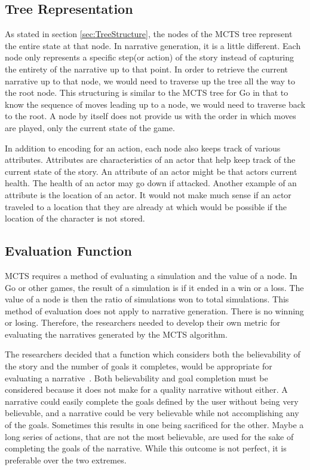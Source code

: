 \documentclass{sig-alternate}
\begin{document}
\subsection{Tree Representation}
As stated in section \ref{sec:TreeStructure}, the nodes of the MCTS tree represent the entire state at that node. In narrative generation, it is a little different. Each node only represents a specific step(or action) of the story instead of capturing the entirety of the narrative up to that point. In order to retrieve the current narrative up to that node, we would need to traverse up the tree all the way to the root node. This structuring is similar to the MCTS tree for Go in that to know the sequence of moves leading up to a node, we would need to traverse back to the root. A node by itself does not provide us with the order in which moves are played, only the current state of the game.

In addition to encoding for an action, each node also keeps track of various attributes. Attributes are characteristics of an actor that help keep track of the current state of the story. An attribute of an actor might be that actors current health. The health of an actor may go down if attacked. Another example of an attribute is the location of an actor. It would not make much sense if an actor traveled to a location that they are already at which would be possible if the location of the character is not stored.

\subsection{Evaluation Function}\label{sec:EvalFunction}
MCTS requires a method of evaluating a simulation and the value of a node. In Go or other games, the result of a simulation is if it ended in a win or a loss. The value of a node is then the ratio of simulations won to total simulations. This method of evaluation does not apply to narrative generation. There is no winning or losing. Therefore, the researchers needed to develop their own metric for evaluating the narratives generated by the MCTS algorithm.

The researchers decided that a function which considers both the believability of the story and the number of goals it completes, would be appropriate for evaluating a narrative~\cite{Narrative}. Both believability and goal completion must be considered because it does not make for a quality narrative without either. A narrative could easily complete the goals defined by the user without being very believable, and a narrative could be very believable while not accomplishing any of the goals. Sometimes this results in one being sacrificed for the other. Maybe a long series of actions, that are not the most believable, are used for the sake of completing the goals of the narrative. While this outcome is not perfect, it is preferable over the two extremes.
\end{document}
